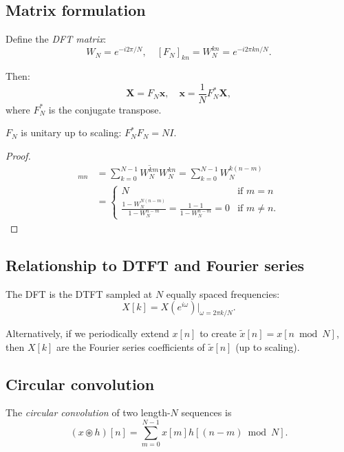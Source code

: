 \begin{notechapter}
\subsection{Matrix formulation}

Define the \emph{DFT matrix}:
\[
W_N = e^{-i 2\pi/N}, \quad [F_N]_{kn} = W_N^{kn} = e^{-i 2\pi kn/N}.
\]

Then:
\[
\mathbf{X} = F_N \mathbf{x}, \quad \mathbf{x} = \frac{1}{N} F_N^* \mathbf{X},
\]
where $F_N^*$ is the conjugate transpose.

\begin{lemma}
$F_N$ is unitary up to scaling: $F_N^* F_N = N I$.
\end{lemma}

\begin{proof}
\begin{align*}
[F_N^* F_N]_{mn} &= \sum_{k=0}^{N-1} \overline{W_N^{km}} W_N^{kn} = \sum_{k=0}^{N-1} W_N^{k(n-m)} \\
&= \begin{cases}
N & \text{if } m = n \\
\frac{1 - W_N^{N(n-m)}}{1 - W_N^{n-m}} = \frac{1 - 1}{1 - W_N^{n-m}} = 0 & \text{if } m \neq n.
\end{cases}
\end{align*}
\end{proof}

\subsection{Relationship to DTFT and Fourier series}

\begin{proposition}
The DFT is the DTFT sampled at $N$ equally spaced frequencies:
\[
X[k] = X(e^{i\omega})\big|_{\omega = 2\pi k/N}.
\]
\end{proposition}

Alternatively, if we periodically extend $x[n]$ to create $\tilde{x}[n] = x[n \bmod N]$, then $X[k]$ are the Fourier series coefficients of $\tilde{x}[n]$ (up to scaling).

\subsection{Circular convolution}

\begin{definition}\label{fourier-analysis:def:circular-convolution}
The \emph{circular convolution} of two length-$N$ sequences is
\[
(x \circledast h)[n] = \sum_{m=0}^{N-1} x[m] h[(n-m) \bmod N].
\]
\end{definition}


\end{notechapter}
